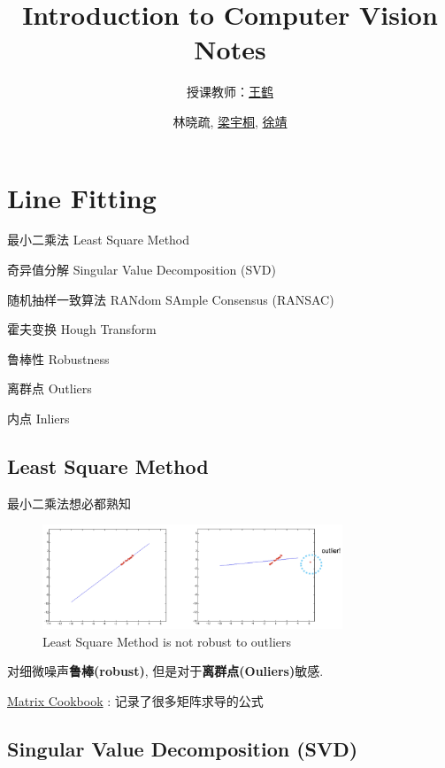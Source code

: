 \documentclass[lang=cn,10pt,green]{elegantbook}
\title{Introduction to Computer Vision Notes}
\subtitle{授课教师：\href{https://hughw19.github.io}{王鹤}}
\author{林晓疏, \href{https://lyt0112.com/}{梁宇桐}, \href{https://iculizhi.github.io/}{徐靖}}
\institute{PKU EECS}
\begin{document}
\maketitle
\frontmatter


\mainmatter

\chapter{Line Fitting}

\begin{introduction}[Keywords]
    \item 最小二乘法 Least Square Method
    \item 奇异值分解 Singular Value Decomposition (SVD)
    \item 随机抽样一致算法 RANdom SAmple Consensus (RANSAC)
    \item 霍夫变换 Hough Transform
    \item 鲁棒性 Robustness
    \item 离群点 Outliers
    \item 内点 Inliers
\end{introduction}

\section{Least Square Method}

最小二乘法想必都熟知

\begin{figure}[htbp]
    \centering
    \includegraphics[width=0.8\textwidth]{figures/not_roboust_outliner.png}
    \caption{Least Square Method is not robust to outliers}
\end{figure}

对细微噪声\textbf{鲁棒(robust)}, 但是对于\textbf{离群点(Ouliers)}敏感.

\href{http://faculty.bicmr.pku.edu.cn/~wenzw/bigdata/matrix-cook-book.pdf}{Matrix Cookbook} : 记录了很多矩阵求导的公式

\section{Singular Value Decomposition (SVD)}
\end{document}
